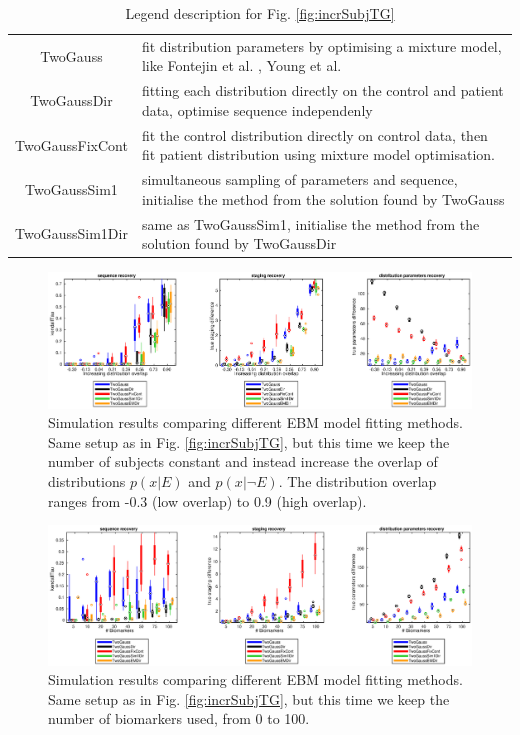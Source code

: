 \begin{table}[H]
\centering
\begin{tabular}{c | p{13cm}}
 TwoGauss & fit distribution parameters by optimising a mixture model, like Fontejin et al. \cite{fonteijn2012event}, Young et al. \cite{young2014data}\\
 TwoGaussDir & fitting each distribution directly on the control and patient data, optimise sequence independenly\\
 TwoGaussFixCont & fit the control distribution directly on control data, then fit patient distribution using mixture model optimisation.\\
 TwoGaussSim1 & simultaneous sampling of parameters and sequence, initialise the method from the solution found by TwoGauss\\
 TwoGaussSim1Dir & same as TwoGaussSim1, initialise the method from the solution found by TwoGaussDir\\
 
\end{tabular}
\caption{Legend description for Fig. \ref{fig:incrSubjTG}}
\end{table}

\begin{figure}[H]
 \hspace{-2cm}
 \includegraphics[scale=\simFigScale]{images/ebm/synthetic/metricsTwoGauss_incrDistOverlap.eps}
 \caption{Simulation results comparing different EBM model fitting methods. Same setup as in Fig. \ref{fig:incrSubjTG}, but this time we keep the number of subjects constant and instead increase the overlap of distributions $p(x|E)$ and $p(x| \neg E)$. The distribution overlap ranges from -0.3 (low overlap) to 0.9 (high overlap). } 
  \label{fig:incrDstTG}
\end{figure}

\begin{figure}[H]
 \hspace{-2cm}
 \includegraphics[scale=\simFigScale]{images/ebm/synthetic/metricsTwoGauss_incrBiomk.eps}
\caption{Simulation results comparing different EBM model fitting methods. Same setup as in Fig. \ref{fig:incrSubjTG}, but this time we keep the number of biomarkers used, from 0 to 100.}
  \label{fig:incBiomkTG}
\end{figure}

